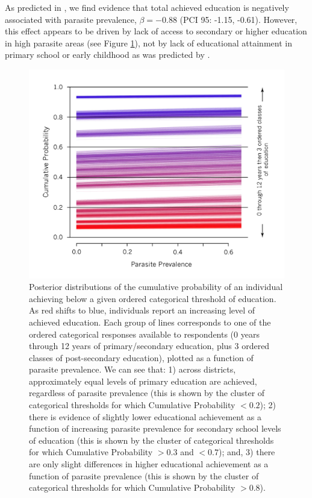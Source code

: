 \documentclass[12pt]{article}
\begin{document}
	As predicted in \citet{Eppig2010}, we find evidence that total achieved education is negatively associated with parasite prevalence, $\beta=-0.88$ (PCI 95: -1.15, -0.61). However, this effect appears to be driven by lack of access to secondary or higher education in high parasite areas (see Figure \ref{resEdu}), not by lack of educational attainment in primary school or early childhood as was predicted by \citet[][pg2]{Eppig2010}. \\
 \begin{figure}
\caption{\label{resEdu}  Posterior distributions of the cumulative probability of an individual achieving below a given ordered categorical threshold of education. As red shifts to blue, individuals report an increasing level of achieved education. Each group of lines corresponds to one of the ordered categorical responses available to respondents (0 years through 12 years of primary/secondary education, plus 3 ordered classes of post-secondary education), plotted as a function of parasite prevalence.  We can see that: 1) across districts, approximately equal levels of primary education are achieved, regardless of parasite prevalence (this is shown by the cluster of categorical thresholds for which Cumulative Probability $<0.2$); 2) there is evidence of slightly lower educational achievement as a function of increasing parasite prevalence for secondary school levels of education (this is shown by the cluster of categorical thresholds for which Cumulative Probability $>0.3$ and $<0.7$); and, 3) there are only slight differences in higher educational achievement as a function of parasite prevalence (this is shown by the cluster of categorical thresholds for which Cumulative Probability $>0.8$).}
\includegraphics[width=5in]{Figures/EducationModel} 
\end{figure}  
\end{document}
